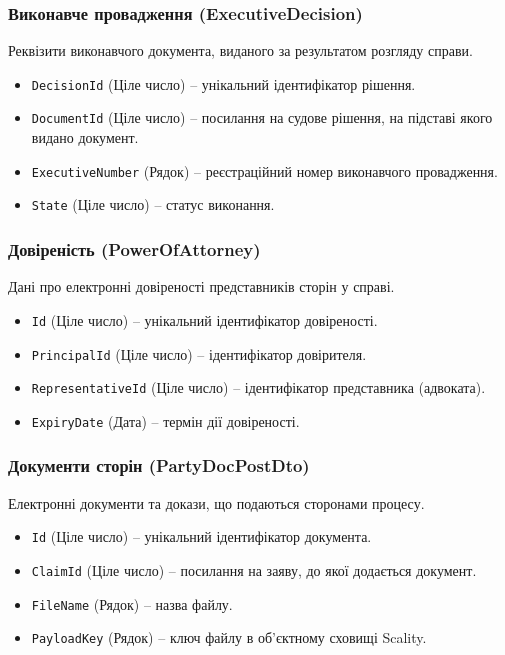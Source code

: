 \documentclass{article}
\begin{document}
\subsubsection{Виконавче провадження (ExecutiveDecision)}
Реквізити виконавчого документа, виданого за результатом розгляду справи.
\begin{itemize}
    \item \texttt{DecisionId} (Ціле число) -- унікальний ідентифікатор рішення.
    \item \texttt{DocumentId} (Ціле число) -- посилання на судове рішення, на підставі якого видано документ.
    \item \texttt{ExecutiveNumber} (Рядок) -- реєстраційний номер виконавчого провадження.
    \item \texttt{State} (Ціле число) -- статус виконання.
\end{itemize}

\subsubsection{Довіреність (PowerOfAttorney)}
Дані про електронні довіреності представників сторін у справі.
\begin{itemize}
    \item \texttt{Id} (Ціле число) -- унікальний ідентифікатор довіреності.
    \item \texttt{PrincipalId} (Ціле число) -- ідентифікатор довірителя.
    \item \texttt{RepresentativeId} (Ціле число) -- ідентифікатор представника (адвоката).
    \item \texttt{ExpiryDate} (Дата) -- термін дії довіреності.
\end{itemize}

\subsubsection{Документи сторін (PartyDocPostDto)}
Електронні документи та докази, що подаються сторонами процесу.
\begin{itemize}
    \item \texttt{Id} (Ціле число) -- унікальний ідентифікатор документа.
    \item \texttt{ClaimId} (Ціле число) -- посилання на заяву, до якої додається документ.
    \item \texttt{FileName} (Рядок) -- назва файлу.
    \item \texttt{PayloadKey} (Рядок) -- ключ файлу в об'єктному сховищі Scality.
\end{itemize}
\end{document}

